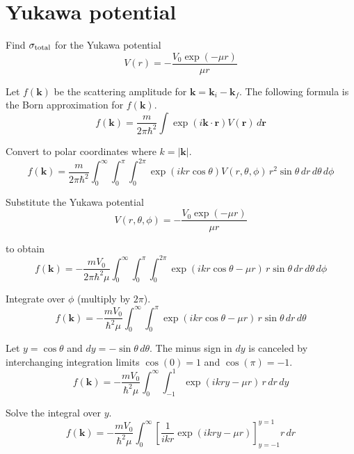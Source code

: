 

\section*{Yukawa potential}

Find $\sigma_{\rm total}$ for the Yukawa potential
\begin{equation*}
V(r)=-\frac{V_0\exp(-\mu r)}{\mu r}
\end{equation*}

Let $f(\mathbf k)$ be the scattering amplitude for $\mathbf k=\mathbf k_i-\mathbf k_f$.
The following formula is the Born approximation for $f(\mathbf k)$.
\begin{equation*}
f(\mathbf k)
=\frac{m}{2\pi\hbar^2}
\int\exp(i\mathbf k\cdot\mathbf r)V(\mathbf r)\,d\mathbf r
\end{equation*}

Convert to polar coordinates where $k=|\mathbf k|$.
\begin{equation*}
f(\mathbf k)
=\frac{m}{2\pi\hbar^2}
\int_0^\infty
\int_0^\pi
\int_0^{2\pi}
\exp(ikr\cos\theta)V(r,\theta,\phi)
\,r^2\sin\theta\,dr\,d\theta\,d\phi
\end{equation*}

Substitute the Yukawa potential
\begin{equation*}
V(r,\theta,\phi)=-\frac{V_0\exp(-\mu r)}{\mu r}
\end{equation*}

to obtain
\begin{equation*}
f(\mathbf k)
=-\frac{mV_0}{2\pi\hbar^2\mu}
\int_0^\infty
\int_0^\pi
\int_0^{2\pi}
\exp(ikr\cos\theta-\mu r)
\,r\sin\theta\,dr\,d\theta\,d\phi
\end{equation*}

Integrate over $\phi$ (multiply by $2\pi$).
\begin{equation*}
f(\mathbf k)
=-\frac{mV_0}{\hbar^2\mu}
\int_0^\infty
\int_0^\pi
\exp(ikr\cos\theta-\mu r)
\,r\sin\theta\,dr\,d\theta
\end{equation*}

Let $y=\cos\theta$ and $dy=-\sin\theta\,d\theta$.
The minus sign in $dy$ is canceled by interchanging integration limits
$\cos(0)=1$ and $\cos(\pi)=-1$.
\begin{equation*}
f(\mathbf k)
=-\frac{mV_0}{\hbar^2\mu}
\int_0^\infty
\int_{-1}^1
\exp(ikry-\mu r)
\,r\,dr\,dy
\end{equation*}

Solve the integral over $y$.
\begin{equation*}
f(\mathbf k)=-\frac{mV_0}{\hbar^2\mu}
\int_0^\infty
\left[\frac{1}{ikr}\exp(ikry-\mu r)\right]_{y=-1}^{y=1}
r\,dr
\end{equation*}

